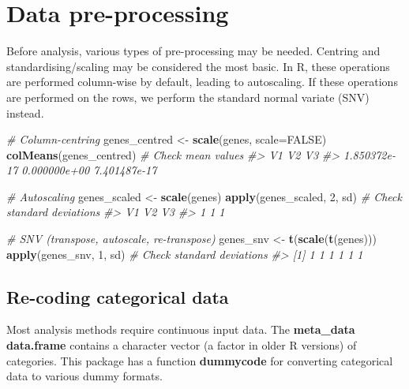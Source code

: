 \documentclass[
]{article}
\newenvironment{Shaded}{\begin{snugshade}}{\end{snugshade}}
\newcommand{\AttributeTok}[1]{\textcolor[rgb]{0.13,0.29,0.53}{#1}}
\newcommand{\CommentTok}[1]{\textcolor[rgb]{0.56,0.35,0.01}{\textit{#1}}}
\newcommand{\ConstantTok}[1]{\textcolor[rgb]{0.56,0.35,0.01}{#1}}
\newcommand{\DecValTok}[1]{\textcolor[rgb]{0.00,0.00,0.81}{#1}}
\newcommand{\FunctionTok}[1]{\textcolor[rgb]{0.13,0.29,0.53}{\textbf{#1}}}
\newcommand{\NormalTok}[1]{#1}
\newcommand{\OtherTok}[1]{\textcolor[rgb]{0.56,0.35,0.01}{#1}}
\begin{document}
\hypertarget{data-pre-processing}{%
\section{Data pre-processing}\label{data-pre-processing}}

Before analysis, various types of pre-processing may be needed. Centring
and standardising/scaling may be considered the most basic. In R, these
operations are performed column-wise by default, leading to autoscaling.
If these operations are performed on the rows, we perform the standard
normal variate (SNV) instead.

\begin{Shaded}
\begin{Highlighting}[]
\CommentTok{\# Column{-}centring}
\NormalTok{genes\_centred }\OtherTok{\textless{}{-}} \FunctionTok{scale}\NormalTok{(genes, }\AttributeTok{scale=}\ConstantTok{FALSE}\NormalTok{)}
\FunctionTok{colMeans}\NormalTok{(genes\_centred) }\CommentTok{\# Check mean values}
\CommentTok{\#\textgreater{}           V1           V2           V3 }
\CommentTok{\#\textgreater{} 1.850372e{-}17 0.000000e+00 7.401487e{-}17}

\CommentTok{\# Autoscaling}
\NormalTok{genes\_scaled }\OtherTok{\textless{}{-}} \FunctionTok{scale}\NormalTok{(genes)}
\FunctionTok{apply}\NormalTok{(genes\_scaled, }\DecValTok{2}\NormalTok{, sd) }\CommentTok{\# Check standard deviations}
\CommentTok{\#\textgreater{} V1 V2 V3 }
\CommentTok{\#\textgreater{}  1  1  1}

\CommentTok{\# SNV (transpose, autoscale, re{-}transpose)}
\NormalTok{genes\_snv }\OtherTok{\textless{}{-}} \FunctionTok{t}\NormalTok{(}\FunctionTok{scale}\NormalTok{(}\FunctionTok{t}\NormalTok{(genes)))}
\FunctionTok{apply}\NormalTok{(genes\_snv, }\DecValTok{1}\NormalTok{, sd) }\CommentTok{\# Check standard deviations}
\CommentTok{\#\textgreater{} [1] 1 1 1 1 1 1}
\end{Highlighting}
\end{Shaded}

\hypertarget{re-coding-categorical-data}{%
\subsection{Re-coding categorical
data}\label{re-coding-categorical-data}}

Most analysis methods require continuous input data. The
\textbf{meta\_data} \textbf{data.frame} contains a character vector (a
factor in older R versions) of categories. This package has a function
\textbf{dummycode} for converting categorical data to various dummy
formats.
\end{document}

